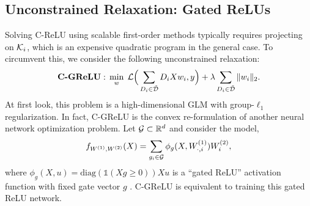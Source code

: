 


\subsection{Unconstrained Relaxation: Gated ReLUs}

Solving C-ReLU using scalable first-order methods typically requires projecting on \( \mathcal{K}_i \), which is an expensive quadratic program in the general case.
To circumvent this, we consider the following unconstrained relaxation:
\begin{equation}\label{convex-forms:eq:unconstrained-relu-mlp}
    \textbf{C-GReLU}: \, \min_{w} \; \mathcal{L}\Big(\sum_{D_i \in \tilde {\mathcal{D}}} D_i X w_i, y\Big)+ \lambda \sum_{D_i \in \tilde {\mathcal{D}}} \|w_i\|_2.
\end{equation}
At first look, this problem is a high-dimensional GLM with group-\( \ell_1 \) regularization.
In fact, C-GReLU is the convex re-formulation of another neural network optimization problem.
Let \( \mathcal{G} \subset \mathbb{R}^d \) and consider the model,
\[
    f_{W^{(1)}, W^{(2)}}(X) = \sum_{g_i \in \mathcal{G}} \phi_{g}(X, W^{(1)}_{\cdot, i}) W^{(2)}_{i},
\]
where \( \phi_{g}(X, u) = \text{diag}(\mathds{1}(Xg \geq 0)) X u \) is a ``gated ReLU'' activation function with fixed gate vector \( g \) \citep{fiat2019decoupling}.
C-GReLU is equivalent to training this gated ReLU network.

